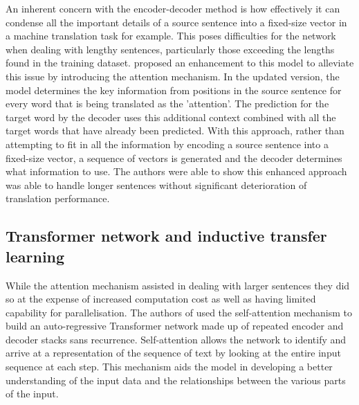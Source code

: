 An inherent concern with the encoder-decoder method is how effectively it can condense all the important details of a source sentence into a fixed-size vector in a machine translation task for example. This poses difficulties for the network when dealing with lengthy sentences, particularly those exceeding the lengths found in the training dataset. \cite{bahdanauNeuralMachineTranslation2016} proposed an enhancement to this model to alleviate this issue by introducing the attention mechanism. In the updated version, the model determines the key information from positions in the source sentence for every word that is being translated as the 'attention'. The prediction for the target word by the decoder uses this additional context combined with all the target words that have already been predicted. With this approach, rather than attempting to fit in all the information by encoding a source sentence into a fixed-size vector, a sequence of vectors is generated and the decoder determines what information to use. The authors were able to show this enhanced approach was able to handle longer sentences without significant deterioration of translation performance.\\

\subsection{Transformer network and inductive transfer learning}
While the attention mechanism assisted in dealing with larger sentences they did so at the expense of increased computation cost as well as having limited capability for parallelisation. The authors of \cite{vaswaniAttentionAllYou2023a} used the self-attention mechanism to build an auto-regressive Transformer network made up of repeated encoder and decoder stacks sans recurrence. Self-attention allows the network to identify and arrive at a representation of the sequence of text by looking at the entire input sequence at each step. This mechanism aids the model in developing a better understanding of the input data and the relationships between the various parts of the input.\\

